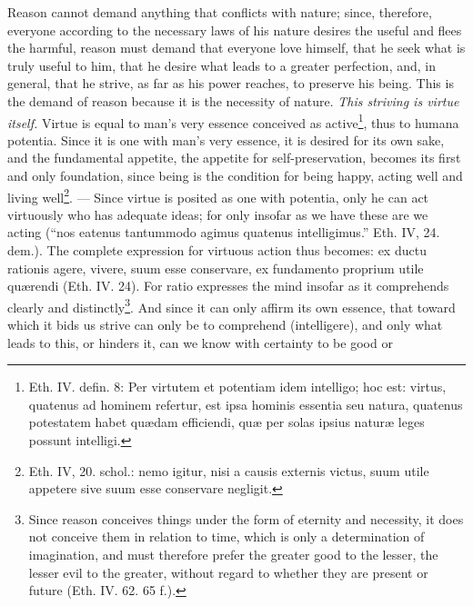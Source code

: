 \documentclass[12pt,a4paper,openany]{book}
\newcommand{\opage}[1]{\marginnote{\footnotesize\textit{[#1]}}}
\begin{document}
Reason cannot demand anything that conflicts with
nature; since, therefore, everyone according to the necessary laws of his nature
desires the useful and flees the harmful, reason
must demand that everyone love himself, that he
seek what is truly useful to him, that he desire
what leads to a greater perfection, and, in
general, that he strive, as far as his power reaches,
to preserve his being. This is the demand of reason because
it is the necessity of nature. \emph{This striving is virtue
itself.} Virtue is equal to man's very essence
conceived as active\footnote{Eth. IV. defin. 8: Per virtutem et potentiam idem intelligo; hoc
est: virtus, quatenus ad hominem refertur, est ipsa hominis essentia
seu natura, quatenus potestatem habet quædam efficiendi, quæ
per solas ipsius naturæ leges possunt intelligi.}, thus to humana potentia. Since it
is one with man's very essence, it is desired for its
own sake, and the fundamental appetite, the appetite for self-preservation,
becomes its first and only foundation, since being is
the condition for being happy, acting well and living
well\footnote{Eth. IV, 20. schol.: nemo igitur, nisi a causis externis victus, suum
utile appetere sive suum esse conservare negligit.}. --- Since virtue is posited as one with potentia,
\opage{125}\setcounter{footnote}{0}only he can act virtuously who has adequate ideas; for only
insofar as we have these are we acting (``nos eatenus tantummodo
agimus quatenus intelligimus.'' Eth. IV, 24. dem.).
The complete expression for virtuous action thus
becomes: ex ductu rationis agere, vivere, suum esse conservare,
ex fundamento proprium utile quærendi (Eth. IV. 24). For ratio
expresses the mind insofar as it comprehends clearly and
distinctly\footnote{Since reason conceives things under the form of eternity and necessity,
it does not conceive them in relation to time, which is only
a determination of imagination, and must therefore prefer the
greater good to the lesser, the lesser evil to the greater, without
regard to whether they are present or future (Eth. IV.
62. 65 f.).}. And since it can only affirm its own essence,
that toward which it bids us strive can only be to
comprehend (intelligere), and only what leads to this, or
hinders it, can we know with certainty to be good or
\end{document}
